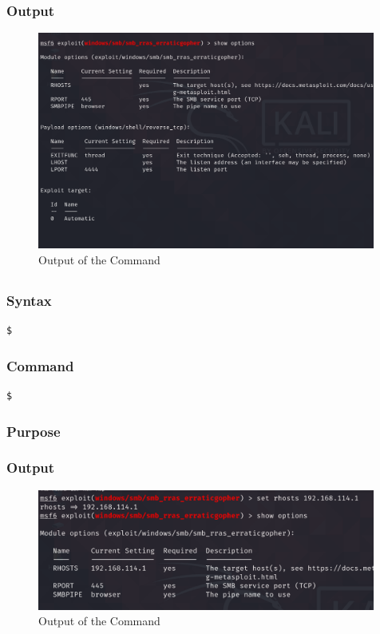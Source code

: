 \documentclass[11pt]{article}
\begin{document}
\subsubsection*{Output}
\begin{figure}[H]
    \centering
    \includegraphics[width=0.99\textwidth]{a3_ss (21).png}
    \caption{Output of the Command}
\end{figure}
\subsection{}

\subsubsection*{Syntax}
\begin{verbatim}
$
\end{verbatim}

\subsubsection*{Command}
\begin{verbatim}
$
\end{verbatim}

\subsubsection*{Purpose}

\subsubsection*{Output}
\begin{figure}[H]
    \centering
    \includegraphics[width=0.99\textwidth]{a3_ss (22).png}
    \caption{Output of the Command}
\end{figure}
\end{document}
